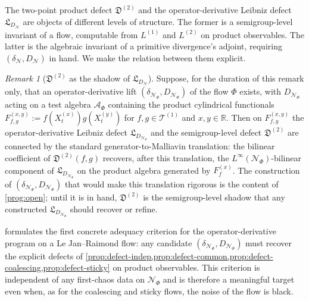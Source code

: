 \documentclass[11pt,reqno]{amsart}
\theoremstyle{plain}
\theoremstyle{definition}
\theoremstyle{remark}
\newtheorem{remark}[theorem]{Remark}
\newcommand{\R}{\mathbb{R}}
\begin{document}
The two-point product defect $\mathfrak D^{(2)}$ and the
operator-derivative Leibniz defect $\mathfrak L_{D_{\mathcal N}}$
are objects of different levels of structure. The former is a
semigroup-level invariant of a flow, computable from $L^{(1)}$ and
$L^{(2)}$ on product observables. The latter is the algebraic
invariant of a primitive divergence's adjoint, requiring
$(\delta_{\mathcal N},D_{\mathcal N})$ in hand. We make the relation
between them explicit.

\begin{remark}[\texorpdfstring{$\mathfrak D^{(2)}$ as the shadow of $\mathfrak L_{D_{\mathcal N}}$}{D^(2) as the shadow of L_D}]\label{rem:defect-shadow}
Suppose, for the duration of this remark only, that an
operator-derivative lift
$(\delta_{\mathcal N_{\Phi}},D_{\mathcal N_{\Phi}})$ of the flow
$\Phi$ exists, with $D_{\mathcal N_{\Phi}}$ acting on a test algebra
$\mathcal A_{\Phi}$ containing the product cylindrical functionals
$F_{f,g}^{(x,y)}:=f(X_t^{(x)})g(X_t^{(y)})$ for $f,g\in\mathcal T^{(1)}$
and $x,y\in\R$. Then on $F_{f,g}^{(x,y)}$ the operator-derivative
Leibniz defect $\mathfrak L_{D_{\mathcal N_{\Phi}}}$ and the
semigroup-level defect $\mathfrak D^{(2)}$ are connected by the
standard generator-to-Malliavin translation: the bilinear coefficient
of $\mathfrak D^{(2)}(f,g)$ recovers, after this translation, the
$L^{\infty}(\mathcal N_{\Phi})$-bilinear component of
$\mathfrak L_{D_{\mathcal N_{\Phi}}}$ on the product algebra
generated by $F_f^{(x)}$. The construction of
$(\delta_{\mathcal N_{\Phi}},D_{\mathcal N_{\Phi}})$ that would make
this translation rigorous is the content of \cref{prog:open}; until
it is in hand, $\mathfrak D^{(2)}$ is the semigroup-level shadow
that any constructed $\mathfrak L_{D_{\mathcal N_{\Phi}}}$ should
recover or refine.
\end{remark}

 formulates the first concrete adequacy
criterion for the operator-derivative program on a Le Jan--Raimond
flow: any candidate
$(\delta_{\mathcal N_{\Phi}},D_{\mathcal N_{\Phi}})$ must recover
the explicit defects of
\cref{prop:defect-indep,prop:defect-common,prop:defect-coalescing,prop:defect-sticky}
on product observables. This criterion is independent of any first-chaos
data on $\mathcal N_{\Phi}$ and is therefore a meaningful target
even when, as for the coalescing and sticky flows, the noise of the
flow is black.
\end{document}
